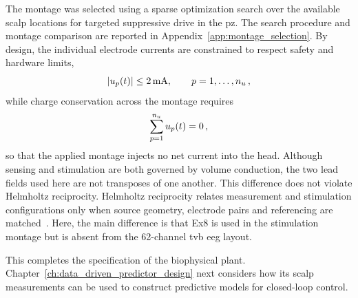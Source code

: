 The montage was selected using a sparse optimization search over the available scalp locations for targeted suppressive drive in the \ac{pz}.
The search procedure and montage comparison are reported in Appendix~\ref{app:montage_selection}.
By design, the individual electrode currents are constrained to respect safety and hardware limits,
%
\begin{equation*}
    |u_p(t)|\leq\SI{2}{\milli\ampere},
    \qquad p=1,\ldots,n_{u}\,,
\end{equation*}
%
while charge conservation across the montage requires
%
\begin{equation*}
    \sum_{p=1}^{n_{u}}u_p(t)=0\,,
\end{equation*}
%
so that the applied montage injects no net current into the head.
Although sensing and stimulation are both governed by volume conduction, the two lead fields used here are not transposes of one another.
This difference does not violate Helmholtz reciprocity.
Helmholtz reciprocity relates measurement and stimulation configurations only when source geometry, electrode pairs and referencing are matched~\cite{Malmivuo1995}.
Here, the main difference is that Ex8 is used in the stimulation montage but is absent from the 62-channel \ac{tvb} \ac{eeg} layout.

This completes the specification of the biophysical plant. Chapter~\ref{ch:data_driven_predictor_design} next considers how its scalp measurements can be used to construct predictive models for closed-loop control.
